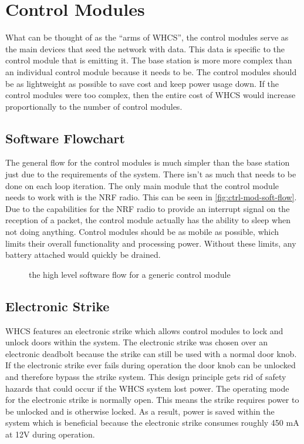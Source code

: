 \documentclass[draft,twocolumn,letterpaper,10pt]{IEEEtran}
\newcommand{\ucffig}[3]{
\begin{figure}[h]
\centering
\makebox[\linewidth][c]{
#2
}
\caption{#3}
\label{#1}
\end{figure}
}
\newcommand{\ucfgfx}[4][scale=1.0]{
\ucffig{#2}{\texttt{[image: \#3]}}{#4}
}
\begin{document}
\section{Control Modules}
What can be thought of as the ``arms of WHCS'', the control modules serve as
the main devices that seed the network with data. This data is specific to the
control module that is emitting it. The base station is more more complex than
an individual control module because it needs to be. The control modules should
be as lightweight as possible to save cost and keep power usage down. If the
control modules were too complex, then the entire cost of WHCS would increase
proportionally to the number of control modules.

\subsection{Software Flowchart}
The general flow for the control modules is much simpler than the base station
just due to the requirements of the system. There isn't as much that needs to
be done on each loop iteration. The only main module that the control module
needs to work with is the NRF radio. This can be seen in
\autoref{fig:ctrl-mod-soft-flow}. Due to the capabilities
for the NRF radio to provide an interrupt signal on the reception of a packet,
the control module actually has the ability to sleep when not doing anything.
Control modules should be as mobile as possible, which limits their overall
functionality and processing power. Without these limits, any battery attached
would quickly be drained.

\ucfgfx[width=\linewidth]{fig:ctrl-mod-soft-flow}{control-module-flow}{the high level
software flow for a generic control module}

\subsection{Electronic Strike}

\label{sec:electronic-strike}

WHCS features an electronic strike which allows control modules to lock and
unlock doors within the system. The electronic strike was chosen over an
electronic deadbolt because the strike can still be used with a normal door
knob. If the electronic strike ever fails during operation the door knob can be
unlocked and therefore bypass the strike system. This design principle gets rid
of safety hazards that could occur if the WHCS system lost power. The operating
mode for the electronic strike is normally open. This means the strike requires
power to be unlocked and is otherwise locked. As a result, power is saved
within the system which is beneficial because the electronic strike consumes
roughly 450 mA at 12V during operation.
\end{document}
